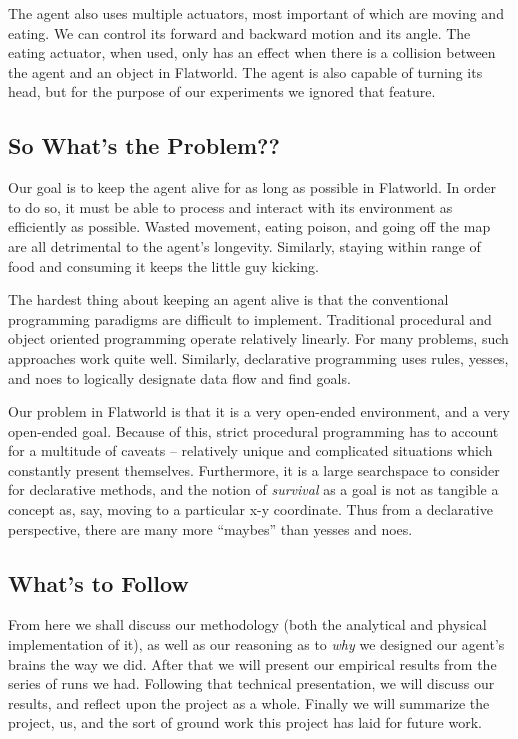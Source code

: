 The agent also uses multiple actuators, most important of which are moving 
and eating. We can control its forward and backward motion and its angle.
The eating actuator, when used, only has an effect when there is a collision
between the agent and an object in Flatworld. The agent is also capable of
turning its head, but for the purpose of our experiments we ignored that 
feature.


\subsection{So What's the Problem??}
Our goal is to keep the agent alive for as long as possible in Flatworld.
In order to do so, it must be able to process and interact with its environment
as efficiently as possible. Wasted movement, eating poison, and going off
the map are all detrimental to the agent's longevity. Similarly, staying
within range of food and consuming it keeps the little guy kicking.

The hardest thing about keeping an agent alive is that the conventional 
programming paradigms are difficult to implement. Traditional procedural and 
object oriented programming operate relatively linearly. For many problems, 
such approaches work quite well. Similarly, declarative programming uses rules, 
yesses, and noes to logically designate data flow and find goals.

Our problem in Flatworld is that it is a very open-ended environment, and a
very open-ended goal. Because of this, strict procedural programming has
to account for a multitude of caveats -- relatively unique and complicated
situations which constantly present themselves. Furthermore, it is a large 
searchspace to consider for declarative methods, and the notion of 
\emph{survival} as a goal is not as tangible a concept as, say, moving to a 
particular x-y coordinate. Thus from a declarative perspective, there are 
many more ``maybes'' than yesses and noes.


\subsection{What's to Follow}
From here we shall discuss our methodology (both the analytical and physical 
implementation of it), as well as our reasoning as to \emph{why} we designed
our agent's brains the way we did. After that we will present our empirical
results from the series of runs we had. Following that technical presentation,
we will discuss our results, and reflect upon the project as a whole. Finally
we will summarize the project, us, and the sort of ground work this project
has laid for future work.
